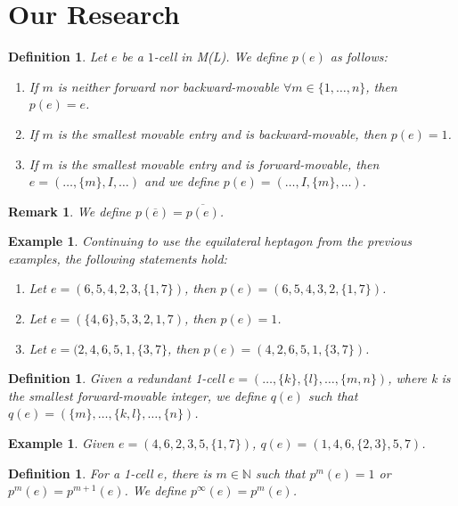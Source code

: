 \documentclass{amsart}
\newtheorem{Definition}[theorem]{Definition}
\newtheorem{Example}[theorem]{Example}
\newtheorem{Remark}[theorem]{Remark}
\newenvironment{definition}{\begin{Definition}\normalfont}{\end{Definition}}
\newenvironment{example}{\begin{Example}\normalfont}{\end{Example}}
\newenvironment{remark}{\begin{Remark}\normalfont}{\end{Remark}}
\newcommand{\bn}{\ensuremath{\mathbb{N}}} %
\begin{document}
\section{Our Research}

\begin{definition}
Let $e$ be a $1$-cell in M(L). We define $p(e)$ as follows:
\begin{enumerate}
\item If $m$ is neither forward nor backward-movable $\forall m\in \{1,\ldots,n\}$, then $p(e)=e$.
\item If $m$ is the smallest movable entry and is backward-movable, then $p(e)=1$.
\item If $m$ is the smallest movable entry and is forward-movable, then $e=(\ldots,\{m\},I,\ldots)$ and we define $p(e)=(\ldots,I,\{m\},\ldots)$.
\end{enumerate}
\end{definition}

\begin{remark}
We define $p(\overline{e})=\overline{p(e)}$.
\end{remark}

\begin{example}
Continuing to use the equilateral heptagon from the previous examples, the following statements hold:
\begin{enumerate}
\item Let $e=(6,5,4,2,3,\{1,7\})$, then $p(e)=(6,5,4,3,2,\{1,7\})$.
\item Let $e=(\{4,6\},5,3,2,1,7)$, then $p(e)=1$.
\item Let $e=(2,4,6,5,1,\{3,7\}$, then $p(e)=(4,2,6,5,1,\{3,7\})$.
\end{enumerate}
\end{example}

\begin{definition}
Given a redundant 1-cell $e=(\ldots,\{k\},\{l\},\ldots,\{m,n\})$, where k is the smallest forward-movable integer, we define $q(e)$ such that $q(e)=(\{m\},\ldots,\{k,l\},\ldots,\{n\})$.
\end{definition}

\begin{example}
Given $e=(4,6,2,3,5,\{1,7\})$, $q(e)=(1,4,6,\{2,3\},5,7)$.
\end{example}

\begin{definition}
For a 1-cell $e$, there is $m\in\bn$ such that $p^{m}(e)=1$ or $p^{m}(e)=p^{m+1}(e)$. We define $p^{\infty}(e)=p^{m}(e)$.
\end{definition}
\end{document}
